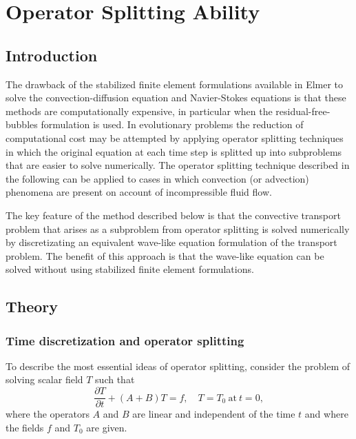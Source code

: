 \chapter{Operator Splitting Ability}
\noindent
{}
\begin{versiona}

\section{Introduction}

The drawback of the stabilized finite element formulations available
in Elmer to solve the convection-diffusion equation and Navier-Stokes 
equations is that these methods are computationally expensive, in particular
when the residual-free-bubbles formulation is used.
In evolutionary problems the reduction of computational cost may be attempted 
by applying operator splitting techniques in which the original equation at 
each time step is splitted up into subproblems that are 
easier to solve numerically. The operator splitting technique described in 
the following can be applied to cases in which convection (or advection) 
phenomena are present on account of incompressible fluid flow. 

The key feature of the method described below is that the convective transport 
problem that arises as a subproblem from operator splitting is solved 
numerically by discretizating an equivalent wave-like equation formulation of 
the transport problem. The benefit of this approach is that the wave-like 
equation can be solved without using stabilized finite element formulations.

\section{Theory}

\subsection{Time discretization and operator splitting}

To describe the most essential ideas of operator splitting, consider the 
problem of solving scalar field $T$ such that
\begin{equation}\label{modeleq}
\frac{\partial T}{\partial t}+(A+B)T=f, \quad T=T_0 \ \mathrm{at}\ t=0,
\end{equation} 
where the operators $A$ and $B$ are linear and independent of the time $t$ and 
where the fields $f$ and $T_0$ are given. 


\end{versiona}
